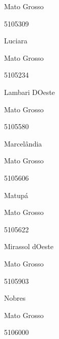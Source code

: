 \documentclass[
  letterpaper,
]{report}
\begin{document}
\n      

Mato Grosso

\n      

5105309

\n      

Luciara

\n    

\n    

\n      

Mato Grosso

\n      

5105234

\n      

Lambari D\textquotesingle Oeste

\n    

\n    

\n      

Mato Grosso

\n      

5105580

\n      

Marcelândia

\n    

\n    

\n      

Mato Grosso

\n      

5105606

\n      

Matupá

\n    

\n    

\n      

Mato Grosso

\n      

5105622

\n      

Mirassol d\textquotesingle Oeste

\n    

\n    

\n      

Mato Grosso

\n      

5105903

\n      

Nobres

\n    

\n    

\n      

Mato Grosso

\n      

5106000
\end{document}
